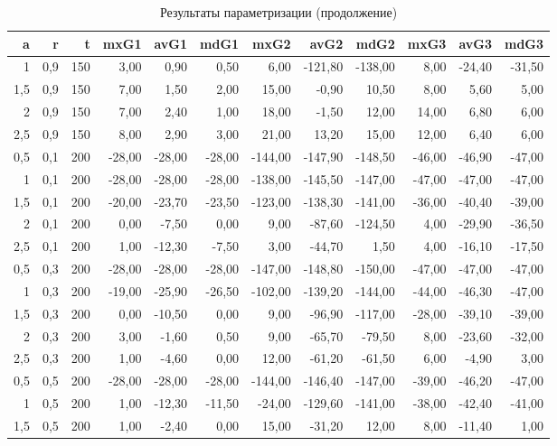 \begin{table}[h]
\centering
\caption{Результаты параметризации (продолжение)}
\begin{tabular}{|r|r|r|r|r|r|r|r|r|r|r|r|}
\hline
a & r & t & mxG1 & avG1 & mdG1 & mxG2 & avG2 & mdG2 & mxG3 & avG3 & mdG3 \\
\hline
1 & 0,9 & 150 & 3,00 & 0,90 & 0,50 & 6,00 & -121,80 & -138,00 & 8,00 & -24,40 & -31,50 \\
1,5 & 0,9 & 150 & 7,00 & 1,50 & 2,00 & 15,00 & -0,90 & 10,50 & 8,00 & 5,60 & 5,00 \\
2 & 0,9 & 150 & 7,00 & 2,40 & 1,00 & 18,00 & -1,50 & 12,00 & 14,00 & 6,80 & 6,00 \\
2,5 & 0,9 & 150 & 8,00 & 2,90 & 3,00 & 21,00 & 13,20 & 15,00 & 12,00 & 6,40 & 6,00 \\
0,5 & 0,1 & 200 & -28,00 & -28,00 & -28,00 & -144,00 & -147,90 & -148,50 & -46,00 & -46,90 & -47,00 \\
1 & 0,1 & 200 & -28,00 & -28,00 & -28,00 & -138,00 & -145,50 & -147,00 & -47,00 & -47,00 & -47,00 \\
1,5 & 0,1 & 200 & -20,00 & -23,70 & -23,50 & -123,00 & -138,30 & -141,00 & -36,00 & -40,40 & -39,00 \\
2 & 0,1 & 200 & 0,00 & -7,50 & 0,00 & 9,00 & -87,60 & -124,50 & 4,00 & -29,90 & -36,50 \\
2,5 & 0,1 & 200 & 1,00 & -12,30 & -7,50 & 3,00 & -44,70 & 1,50 & 4,00 & -16,10 & -17,50 \\
0,5 & 0,3 & 200 & -28,00 & -28,00 & -28,00 & -147,00 & -148,80 & -150,00 & -47,00 & -47,00 & -47,00 \\
1 & 0,3 & 200 & -19,00 & -25,90 & -26,50 & -102,00 & -139,20 & -144,00 & -44,00 & -46,30 & -47,00 \\
1,5 & 0,3 & 200 & 0,00 & -10,50 & 0,00 & 9,00 & -96,90 & -117,00 & -28,00 & -39,10 & -39,00 \\
2 & 0,3 & 200 & 3,00 & -1,60 & 0,50 & 9,00 & -65,70 & -79,50 & 8,00 & -23,60 & -32,00 \\
2,5 & 0,3 & 200 & 1,00 & -4,60 & 0,00 & 12,00 & -61,20 & -61,50 & 6,00 & -4,90 & 3,00 \\
0,5 & 0,5 & 200 & -28,00 & -28,00 & -28,00 & -144,00 & -146,40 & -147,00 & -39,00 & -46,20 & -47,00 \\
1 & 0,5 & 200 & 1,00 & -12,30 & -11,50 & -24,00 & -129,60 & -141,00 & -38,00 & -42,40 & -41,00 \\
1,5 & 0,5 & 200 & 1,00 & -2,40 & 0,00 & 15,00 & -31,20 & 12,00 & 8,00 & -11,40 & 1,00 \\

\end{tabular}
\end{table}
